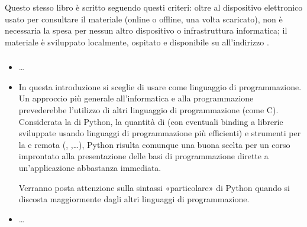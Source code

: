 \documentclass[letterpaper,10pt,italian]{jupyterBook}
\begin{document}
\sphinxAtStartPar
Questo stesso libro è scritto seguendo questi criteri: oltre al dispositivo elettronico usato per consultare il materiale (online o offline, una volta scaricato), non è necessaria la spesa per nessun altro dispositivo o infrastruttura informatica; il materiale è sviluppato localmente, ospitato e disponibile su  all’indirizzo .

\sphinxAtStartPar
{}


\subsubsection*{}
\begin{itemize}
\item {} 
\sphinxAtStartPar
{} …

\item {} 
\sphinxAtStartPar
{} In questa introduzione si sceglie di usare  come linguaggio di programmazione.
Un approccio più generale all’informatica e alla programmazione prevederebbe l’utilizzo di altri linguaggio di programmazione (come C).
Considerata la  di Python, la quantità di  (con eventuali binding a librerie sviluppate usando linguaggi di programmazione più efficienti) e strumenti per la  e remota (, ,…), Python risulta comunque una buona scelta per un corso improntato alla presentazione delle basi di programmazione dirette a un’applicazione abbastanza immediata.

\sphinxAtStartPar
Verranno posta attenzione sulla sintassi «particolare» di Python quando si discosta maggiormente dagli altri linguaggi di programmazione.

\item {} 
\sphinxAtStartPar
{} …

\end{itemize}
\end{document}
